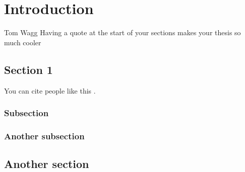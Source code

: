 \documentclass[../Main.tex]{subfiles}
\begin{document}
\chapter{Introduction}

\begin{chapquote}{Tom Wagg}
    \noindent Having a quote at the start of your sections makes your thesis so much cooler
\end{chapquote}

\chaptertoc{}

\section{Section 1}

You can cite people like this \citep{Wagg+2022}.

\subsection{Subsection}

\subsection{Another subsection}

\section{Another section}

\ifSubfilesClassLoaded{%
   \scriptsize
   \setlength{\bibsep}{0pt plus 0.3ex}
  
}{}
\end{document}

